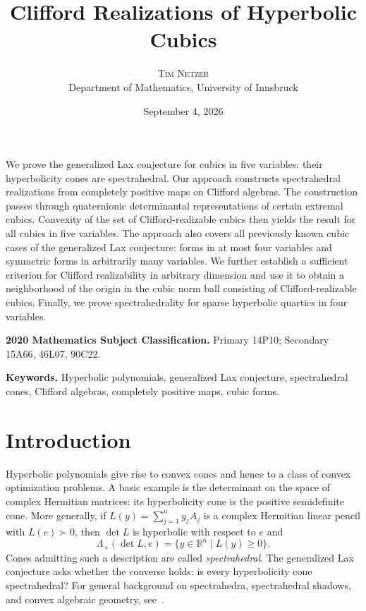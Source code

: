 \documentclass[11pt,onecolumn]{article}
\title{Clifford Realizations of Hyperbolic Cubics}
\author{\textsc{Tim Netzer}\\[0.25em]
  {\small Department of Mathematics, University of Innsbruck}}
\date{September 4, 2026}
\makeatletter
\theoremstyle{blueplain}
\theoremstyle{bluedefinition}
\theoremstyle{bluedefinition}
\newcommand{\R}{\mathbb R}
\renewcommand{\maketitle}{%
    \thispagestyle{plain}%
    \begin{center}
        \vspace*{-2.6em}
        {\LARGE\bfseries\color{linkblue}\@title\par}
        \vspace{1.25em}
        {\large\@author\par}
        \vspace{0.7em}
        {\small\color{gray}\@date\par}
    \end{center}
    \vspace{1.1em}
}
\renewenvironment{abstract}{%
    \begin{center}
    \begin{minipage}{0.9\textwidth}
    \small
    \begin{center}
        {\bfseries\color{linkblue}\abstractname}
    \end{center}
    \vspace{-0.4em}
}{%
    \end{minipage}
    \end{center}
    \vspace{0.8em}
}
\makeatother
\begin{document}
\maketitle

\begin{abstract}
We prove the generalized Lax conjecture for cubics in five variables:
their hyperbolicity cones are spectrahedral.  Our approach constructs
spectrahedral realizations from completely positive maps on Clifford
algebras.  The construction passes through quaternionic determinantal
representations of certain extremal cubics.  Convexity of the set of Clifford-realizable cubics
then yields the result for all cubics in five variables.
The approach also covers all previously known cubic cases of
the generalized Lax conjecture: forms in at most four variables and
symmetric forms in arbitrarily many variables.
We further establish a sufficient criterion for Clifford realizability
in arbitrary dimension and use it to obtain a neighborhood of
the origin in the cubic norm ball consisting of Clifford-realizable
cubics.  Finally, we prove spectrahedrality for sparse hyperbolic
quartics in four variables.
\end{abstract}

\noindent\textbf{2020 Mathematics Subject Classification.}
Primary 14P10; Secondary 15A66, 46L07, 90C22.

\noindent\textbf{Keywords.}
Hyperbolic polynomials, generalized Lax conjecture, spectrahedral cones,
Clifford algebras, completely positive maps, cubic forms.

\section*{Introduction}

Hyperbolic polynomials give rise to convex cones and hence to a class of
convex optimization problems.  A basic example is the determinant on the
space of complex Hermitian matrices: its hyperbolicity cone
is the positive semidefinite cone.  More generally, if
$L(y)=\sum_{j=1}^n y_jA_j$ is a complex Hermitian  linear pencil with
$L(e)\succ0$, then $\det L$ is hyperbolic with respect to $e$ and
\[
 \Lambda_+(\det L,e)=\{y\in\R^n\mid L(y)\geqslant0\}.
\]
Cones admitting such a description are called \emph{spectrahedral}. 
The generalized Lax conjecture asks whether the converse holds: is every
hyperbolicity cone spectrahedral?  
For general background on spectrahedra, spectrahedral shadows, and convex
algebraic geometry, see~\cite{BlekhermanParriloThomas, NetzerPlaumann}.
\end{document}
